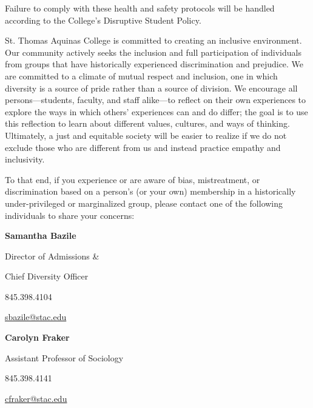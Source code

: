 \documentclass[11pt,letterpaper]{article}
\begin{document}
Failure to comply with these health and safety protocols will be handled according to the College's Disruptive Student Policy.
\sectionbreak





\newpage






St. Thomas Aquinas College is committed to creating an inclusive environment. Our community actively seeks the inclusion and full participation of individuals from groups that have historically experienced discrimination and prejudice. We are committed to a climate of mutual respect and inclusion, one in which diversity is a source of pride rather than a source of division. We encourage all persons---students, faculty, and staff alike---to reflect on their own experiences to explore the ways in which others' experiences can and do differ; the goal is to use this reflection to learn about different values, cultures, and ways of thinking. Ultimately, a just and equitable society will be easier to realize if we do not exclude those who are different from us and instead practice empathy and inclusivity. \pspace

To that end, if you experience or are aware of bias, mistreatment, or discrimination based on a person's (or your own) membership in a historically under-privileged or marginalized group, please contact one of the following individuals to share your concerns: \pspace

        \hfill\begin{minipage}[t]{0.45\textwidth}
        {\bfseries Samantha Bazile} \par
        Director of Admissions \& \par
        Chief Diversity Officer \par
        845.398.4104 \par
        \href{mailto:sbazile@stac.edu}{sbazile@stac.edu}
        \end{minipage}\begin{minipage}[t]{0.45\textwidth}
        {\bfseries Carolyn Fraker} \par
        Assistant Professor of Sociology \par
        845.398.4141 \par
        \href{mailto:cfraker@stac.edu}{cfraker@stac.edu}
        \end{minipage} \pspace
        
\end{document}
